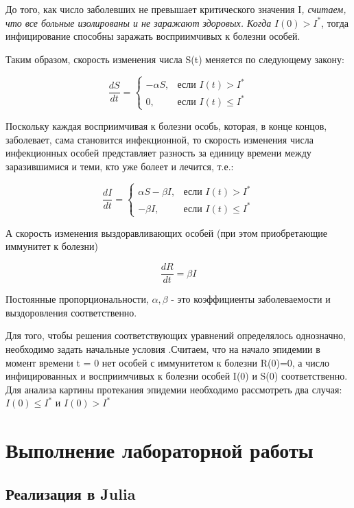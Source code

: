 \documentclass[
  12pt,
  a4paper,
  DIV=11,
  numbers=noendperiod]{scrreprt}
\begin{document}
До того, как число заболевших не превышает критического значения
I\emph{, считаем, что все больные изолированы и не заражают здоровых.
Когда} \(I(0) > I^*\), тогда инфицирование способны заражать
восприимчивых к болезни особей.

Таким образом, скорость изменения числа S(t) меняется по следующему
закону:

\[
\frac{dS}{dt} = 
\begin{cases}
-\alpha S, & \text{если } I(t) > I^* \\
0, & \text{если } I(t) \leq I^*
\end{cases}
\]

Поскольку каждая восприимчивая к болезни особь, которая, в конце концов,
заболевает, сама становится инфекционной, то скорость изменения числа
инфекционных особей представляет разность за единицу времени между
заразившимися и теми, кто уже болеет и лечится, т.е.:

\[
\frac{dI}{dt} = 
\begin{cases}
\alpha S - \beta I, & \text{если } I(t) > I^* \\
-\beta I, & \text{если } I(t) \leq I^*
\end{cases}
\]

А скорость изменения выздоравливающих особей (при этом приобретающие
иммунитет к болезни)

\[
\frac{dR}{dt} = \beta I
\]

Постоянные пропорциональности, \(\alpha, \beta\) - это коэффициенты
заболеваемости и выздоровления соответственно.

Для того, чтобы решения соответствующих уравнений определялось
однозначно, необходимо задать начальные условия .Считаем, что на начало
эпидемии в момент времени t = 0 нет особей с иммунитетом к болезни
R(0)=0, а число инфицированных и восприимчивых к болезни особей I(0) и
S(0) соответственно. Для анализа картины протекания эпидемии необходимо
рассмотреть два случая: \(I(0) \leq I^*\) и \(I(0) > I^*\)

\chapter{Выполнение лабораторной
работы}\label{ux432ux44bux43fux43eux43bux43dux435ux43dux438ux435-ux43bux430ux431ux43eux440ux430ux442ux43eux440ux43dux43eux439-ux440ux430ux431ux43eux442ux44b}

\section{Реализация в
Julia}\label{ux440ux435ux430ux43bux438ux437ux430ux446ux438ux44f-ux432-julia}
\end{document}
